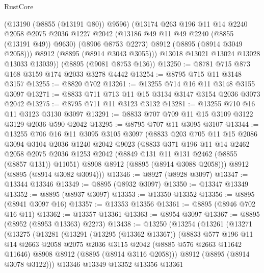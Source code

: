 \begin{lexlean}{RustCore}
\begin{coremodule}
          (@13190 (@8855 (@13191 @80)) @9596)
          (@13174
            @263
            @196
            @11
            @14
            @2240
            @2058
            @2075
            @2036
            @1227
            @2042
            (@13186 @49 @11 @49 @2240 (@8855 (@13191 @49)) @9630)
            (@8906 @8753 @2273)
            @8912
            (@8895 (@8914 @3049 @2058)))
          @8912
          (@8895 (@8914 @3043 @3055)))
        @13018
        @13021
        @13024
        @13028
        @13033
        @13039))
    (@8895 (@9081 @8753 @136))
@13250 := @8781 @715 @873 @168 @3159 @174 @2033 @3278 @4442
@13254 := @8795 @715 @11 @3148 @3157
@13255 := @8820 @702
@13261 := @13255 @714 @16 @11 @3148 @3155 @3097
@13271 := @8833 @711 @713 @11 @15 @3134 @3147 @3154 @2036 @3073 @2042
@13275 := @8795 @711 @11 @3123 @3132
@13281 := @13255 @710 @16 @11 @3123 @3130 @3097
@13291 := @8833 @707 @709 @11 @15 @3109 @3122 @3129 @2036 @590 @2042
@13295 := @8795 @707 @11 @3095 @3107
@13344 := @13255
    @706
    @16
    @11
    @3095
    @3105
    @3097
    (@8833
      @203
      @705
      @11
      @15
      @2086
      @3094
      @3104
      @2036
      @1240
      @2042
      @9023
      (@8833
        @371
        @196
        @11
        @14
        @2462
        @2058
        @2075
        @2036
        @1253
        @2042
        (@8849 @131 @11 @131 @2462 (@8855 (@8857 @131)) @11051)
        @8908
        @8912
        (@8895 (@8914 @3088 @2058)))
      @8912
      (@8895 (@8914 @3082 @3094)))
@13346 := @8927 (@8928 @3097)
@13347 := @13344 @13346
@13349 := @8895 (@8932 @3097)
@13350 := @13347 @13349
@13352 := @8895 (@8937 @3097)
@13353 := @13350 @13352
@13356 := @8895 (@8941 @3097 @16)
@13357 := @13353 @13356
@13361 := @8895 (@8946 @702 @16 @11)
@13362 := @13357 @13361
@13363 := @8954 @3097
@13367 := @8895 (@8952 (@8953 @13363) @2273)
@13438 := @13250
    (@13254
      (@13261
        (@13271
          (@13275
            (@13281
              (@13291
                (@13295 (@13362 @13367))
                (@8833
                  @577
                  @196
                  @11
                  @14
                  @2663
                  @2058
                  @2075
                  @2036
                  @3115
                  @2042
                  (@8885 @576 @2663 @11642 @11646)
                  @8908
                  @8912
                  (@8895 (@8914 @3116 @2058)))
                @8912
                (@8895 (@8914 @3078 @3122)))
              @13346
              @13349
              @13352
              @13356
              @13361

\end{coremodule}
\end{lexlean}
